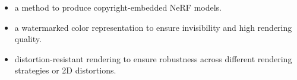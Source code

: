 \documentclass[10pt,twocolumn,letterpaper]{article}
\newcommand{\Fref}[1]{Figure~\ref{#1}}
\newcommand{\renjie}[1]{\textcolor{red}{{#1}}}
\begin{document}






\begin{itemize}
    \item a method to produce copyright-embedded NeRF models.
    
    \item a watermarked color representation to ensure invisibility and high rendering quality.
    
    
    \item distortion-resistant rendering to ensure robustness across different rendering strategies or 2D distortions.
\end{itemize}
\end{document}
